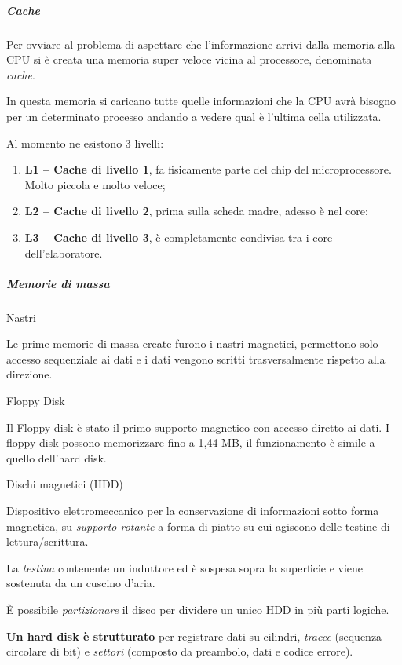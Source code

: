 \subparagraph{\texorpdfstring{\emph{Cache}}{Cache}}\label{cache}

Per ovviare al problema di aspettare che l'informazione arrivi dalla
memoria alla CPU si è creata una memoria super veloce vicina al
processore, denominata \emph{cache}.

In questa memoria si caricano tutte quelle informazioni che la CPU avrà
bisogno per un determinato processo andando a vedere qual è l'ultima
cella utilizzata.

Al momento ne esistono 3 livelli:

\begin{enumerate}
\def\labelenumi{\arabic{enumi}.}
\item
  \textbf{L1 -- Cache di livello 1}, fa fisicamente parte del chip del
  microprocessore. Molto piccola e molto veloce;
\item
  \textbf{L2 -- Cache di livello 2}, prima sulla scheda madre, adesso è
  nel core;
\item
  \textbf{L3 -- Cache di livello 3}, è completamente condivisa tra i
  core dell'elaboratore.
\end{enumerate}

\subparagraph{\texorpdfstring{\emph{Memorie di
massa}}{Memorie di massa}}\label{memorie-di-massa}

Nastri

Le prime memorie di massa create furono i nastri magnetici, permettono
solo accesso sequenziale ai dati e i dati vengono scritti
trasversalmente rispetto alla direzione.

Floppy Disk

Il Floppy disk è stato il primo supporto magnetico con accesso diretto
ai dati. I floppy disk possono memorizzare fino a 1,44 MB, il
funzionamento è simile a quello dell'hard disk.

Dischi magnetici (HDD)

Dispositivo elettromeccanico per la conservazione di informazioni sotto
forma magnetica, su \emph{supporto rotante} a forma di piatto su cui
agiscono delle testine di lettura/scrittura.

La \emph{testina} contenente un induttore ed è sospesa sopra la
superficie e viene sostenuta da un cuscino d'aria.

È possibile \emph{partizionare} il disco per dividere un unico HDD in
più parti logiche.

\textbf{Un hard disk è strutturato} per registrare dati su cilindri,
\emph{tracce} (sequenza circolare di bit) e \emph{settori} (composto da
preambolo, dati e codice errore).


